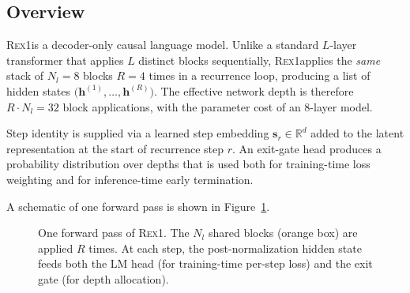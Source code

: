 \documentclass[11pt,a4paper]{article}
\newcommand{\REX}{\textsc{Rex1}\xspace}
\providecommand{\xspace}{}
\begin{document}
\subsection{Overview}

\REX is a decoder-only causal language model. Unlike a standard $L$-layer
transformer that applies $L$ distinct blocks sequentially, \REX applies the
\emph{same} stack of $N_l = 8$ blocks $R = 4$ times in a recurrence loop,
producing a list of hidden states $\bigl(\mathbf{h}^{(1)}, \ldots,
\mathbf{h}^{(R)}\bigr)$. The effective network depth is therefore
$R \cdot N_l = 32$ block applications, with the parameter cost of an 8-layer
model.

Step identity is supplied via a learned step embedding $\mathbf{s}_r \in
\mathbb{R}^{d}$ added to the latent representation at the start of recurrence
step $r$. An exit-gate head produces a probability distribution over depths
that is used both for training-time loss weighting and for inference-time
early termination.

A schematic of one forward pass is shown in Figure~\ref{fig:arch}.

\begin{figure}[h]
\centering
{}
\caption{One forward pass of \REX. The $N_l$ shared blocks (orange box) are
applied $R$ times. At each step, the post-normalization hidden state feeds
both the LM head (for training-time per-step loss) and the exit gate (for
depth allocation).}
\label{fig:arch}
\end{figure}
\end{document}
